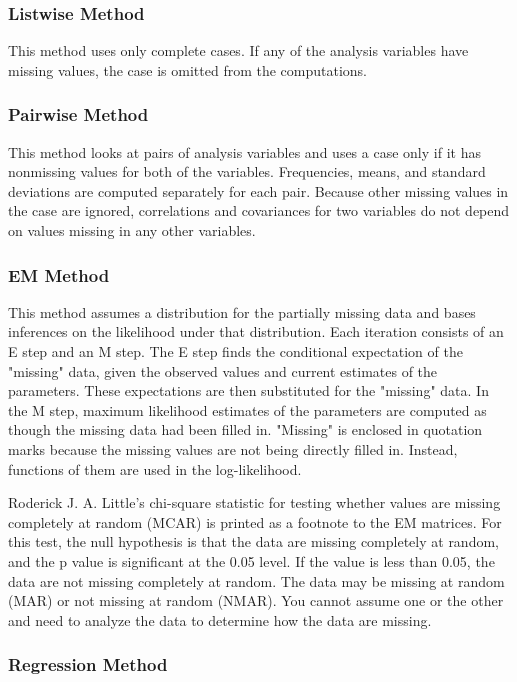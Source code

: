 \documentclass[a4paper,12pt]{article}
\begin{document}
\subsubsection*{Listwise Method}

This method uses only complete cases. If any of the analysis variables have missing values, the case is omitted from the computations.

\subsubsection*{Pairwise Method}

This method looks at pairs of analysis variables and uses a case only if it has nonmissing values for both of the variables. Frequencies, means, and standard deviations are computed separately for each pair. Because other missing values in the case are ignored, correlations and covariances for two variables do not depend on values missing in any other variables.

\subsubsection*{EM Method}

This method assumes a distribution for the partially missing data and bases inferences on the likelihood under that distribution. Each iteration consists of an E step and an M step. The E step finds the conditional expectation of the "missing" data, given the observed values and current estimates of the parameters. These expectations are then substituted for the "missing" data. In the M step, maximum likelihood estimates of the parameters are computed as though the missing data had been filled in. "Missing" is enclosed in quotation marks because the missing values are not being directly filled in. Instead, functions of them are used in the log-likelihood.

Roderick J. A. Little's chi-square statistic for testing whether values are missing completely at random (MCAR) is printed as a footnote to the EM matrices. For this test, the null hypothesis is that the data are missing completely at random, and the p value is significant at the 0.05 level. If the value is less than 0.05, the data are not missing completely at random. The data may be missing at random (MAR) or not missing at random (NMAR). You cannot assume one or the other and need to analyze the data to determine how the data are missing.

\subsubsection*{Regression Method}
\end{document}
